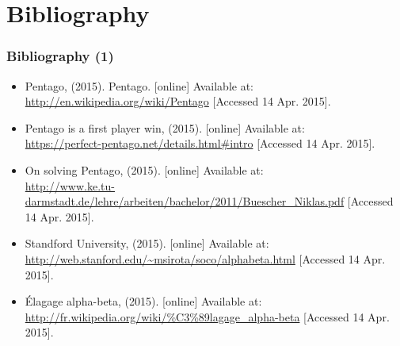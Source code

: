 \documentclass[10pt]{beamer}
\begin{document}
\section{Bibliography}

\begin{frame}[fragile]
\frametitle{Bibliography (1)}

	\begin{itemize}
	\item Pentago, (2015). Pentago. [online] Available at:\\
	\url{http://en.wikipedia.org/wiki/Pentago} [Accessed 14 Apr. 2015].

	\item Pentago is a first player win, (2015). [online] Available at:\\
	\url{https://perfect-pentago.net/details.html#intro} [Accessed 14 Apr. 2015].

	\item On solving Pentago, (2015). [online] Available at:\\
	\url{http://www.ke.tu-darmstadt.de/lehre/arbeiten/bachelor/2011/Buescher_Niklas.pdf} [Accessed 14 Apr. 2015].

	\item Standford University, (2015).  [online] Available at:\\
	\url{http://web.stanford.edu/~msirota/soco/alphabeta.html} [Accessed 14 Apr.
	2015].
	
	\item Élagage alpha-beta, (2015).  [online] Available at:
	\url{http://fr.wikipedia.org/wiki/%C3%89lagage_alpha-beta} [Accessed 14 Apr. 2015].
	
	\end{itemize}
\end{frame}
\end{document}
